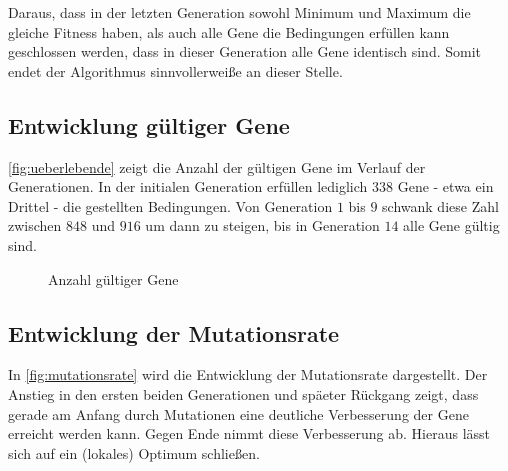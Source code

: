 Daraus, dass in der letzten Generation sowohl Minimum und Maximum die gleiche Fitness haben,
als auch alle Gene die Bedingungen erfüllen kann geschlossen werden, dass in dieser Generation alle Gene identisch sind.
Somit endet der Algorithmus sinnvollerweiße an dieser Stelle.

\subsection{Entwicklung gültiger Gene}

\autoref{fig:ueberlebende} zeigt die Anzahl der gültigen Gene im Verlauf der Generationen.
In der initialen Generation erfüllen lediglich $338$ Gene - etwa ein Drittel - die gestellten Bedingungen.
Von Generation $1$ bis $9$ schwank diese Zahl zwischen $848$ und $916$ um dann zu steigen,
 bis in Generation $14$ alle Gene gültig sind.

\begin{figure}[ht]
    \centering
	\caption{Anzahl gültiger Gene}
	\label{fig:ueberlebende}
\end{figure}

\subsection{Entwicklung der Mutationsrate}

In \autoref{fig:mutationsrate} wird die Entwicklung der Mutationsrate dargestellt.
Der Anstieg in den ersten beiden Generationen und späeter Rückgang zeigt,
dass gerade am Anfang durch Mutationen eine deutliche Verbesserung der Gene erreicht werden kann.
Gegen Ende nimmt diese Verbesserung ab. Hieraus lässt sich auf ein (lokales) Optimum schließen.

